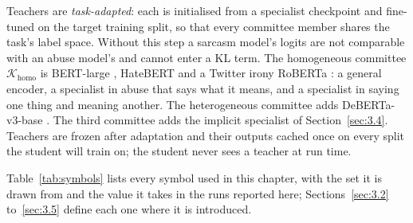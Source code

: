 Teachers are \emph{task-adapted}: each is initialised from a specialist checkpoint and fine-tuned on
the target training split, so that every committee member shares the task's label space. Without
this step a sarcasm model's logits are not comparable with an abuse model's and cannot enter a KL
term. The homogeneous committee $\mathcal{K}_{\text{homo}}$ is BERT-large \cite{devlin2019bert},
HateBERT \cite{caselli2021hatebert} and a Twitter irony RoBERTa \cite{barbieri2020tweeteval,
liu2019roberta}: a general encoder, a specialist in abuse that says what it means, and a specialist
in saying one thing and meaning another. The heterogeneous committee adds DeBERTa-v3-base
\cite{he2023debertav3}. The third committee adds the implicit specialist of Section~\ref{sec:3.4}.
Teachers are frozen after adaptation and their outputs cached once on every split the student will
train on; the student never sees a teacher at run time.

Table~\ref{tab:symbols} lists every symbol used in this chapter, with the set it is drawn from and
the value it takes in the runs reported here; Sections~\ref{sec:3.2} to~\ref{sec:3.5} define each one
where it is introduced.

